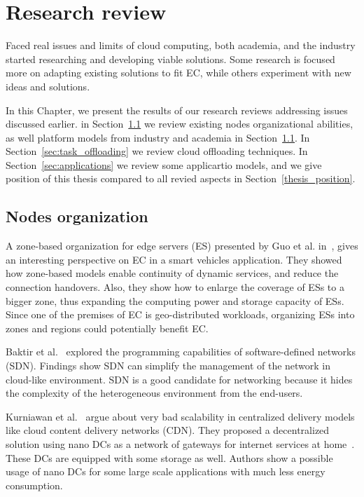 \chapter{Research review}\label{chapter:Review}
%
Faced real issues and limits of cloud computing, both academia, and the industry started researching and developing viable solutions. Some research is focused more on adapting existing solutions to fit EC, while others experiment with new ideas and solutions. 

In this Chapter, we present the results of our research reviews addressing issues discussed earlier. in Section~\ref{sec:nodes_organization} we review existing nodes organizational abilities, as well platform models from industry and academia in Section~\ref{sec:nodes_organization}. In Section~\ref{sec:task_offloading} we review cloud offloading techniques. In Section~\ref{sec:applications} we review some applicartio models, and we give position of this thesis compared to all revied aspects in Section~\ref{thesis_position}.
%
%
\section{Nodes organization}\label{sec:nodes_organization}
A zone-based organization for edge servers (ES) presented by Guo et al. in~\cite{GuoRG20}, gives an interesting perspective on EC in a smart vehicles application. They showed how zone-based models enable continuity of dynamic services, and reduce the connection handovers. Also, they show how to enlarge the coverage of ESs to a bigger zone, thus expanding the computing power and storage capacity of ESs. Since one of the premises of EC is geo-distributed workloads, organizing ESs into zones and regions could potentially benefit EC. 

Baktir et al.~\cite{BaktirOE17} explored the programming capabilities of software-defined networks (SDN). Findings show SDN can simplify the management of the network in cloud-like environment. SDN is a good candidate for networking because it hides the complexity of the heterogeneous environment from the end-users.

Kurniawan et al.~\cite{inbookKurniawan} argue about very bad scalability in centralized delivery models like cloud content delivery networks (CDN). They proposed a decentralized solution using nano DCs as a network of gateways for internet services at home~\cite{inbookKurniawan}. These DCs are equipped with some storage as well. Authors show a possible usage of nano DCs for some large scale applications with much less energy consumption. 


